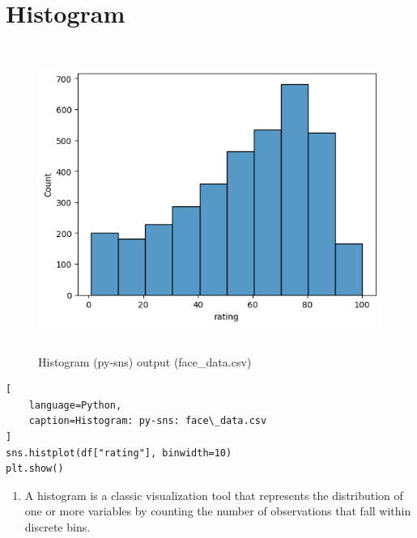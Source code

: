 \section{Histogram \cite{data/online/seaborn.histplot}} \label{Visualizing Data/Histogram}


\begin{table}[H]
\begin{minipage}[t]{0.35\linewidth}
\begin{figure}[H]
    \centering
    \includegraphics[width=0.9\linewidth, height=10cm, keepaspectratio]{images/data/__visualizations__/sns-hist-rating-face-data.png}
    \caption{Histogram (py-sns) output (face\_data.csv)}
\end{figure}
\end{minipage}
\hspace{0.2cm}
\vrule width 1pt
\hspace{0.5cm}
\begin{minipage}[t]{0.57\linewidth}
\begin{lstlisting}[
    language=Python,
    caption=Histogram: py-sns: face\_data.csv
]
sns.histplot(df["rating"], binwidth=10)
plt.show()
\end{lstlisting}

\vspace{0.2cm}

\begin{enumerate}
    \item A histogram is a classic visualization tool that represents the distribution of one or more variables by counting the number of observations that fall within discrete bins. \hfill \cite{data/online/seaborn.histplot}


\end{enumerate}
\end{minipage}
\end{table}
